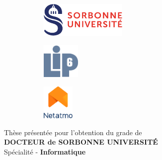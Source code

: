 

\newcommand{\jurymember}[6]{\hspace{1.5em}{#6} \textbf{{#1} {#2}}, {#3}, {#4} \hfill \textit{{#5}}\\}

\begin{titlepage}

    
    \begin{figure}
        \begin{subfigure}{.3\textwidth}
            \centering
            \includegraphics[height=1.7cm]{title_page/assets/sorbonne.pdf}
        \end{subfigure}\hfill
        \begin{subfigure}{.3\textwidth}
            \centering
            \includegraphics[height=1.7cm]{title_page/assets/LogoLIP6.pdf}
        \end{subfigure}\hfill
        \begin{subfigure}{.3\textwidth}
            \centering
            \includegraphics[height=1.7cm]{title_page/assets/netatmo_logo_color.pdf}
        \end{subfigure}
    \end{figure}
    
    \begin{center}
        {\large Thèse présentée pour l'obtention du grade de}\\
        {\large \textbf{DOCTEUR de SORBONNE UNIVERSITÉ}}\\

        \vspace{0.5em}
        {\large Spécialité - \textbf{Informatique}}\\


\end{center}
\end{titlepage}

